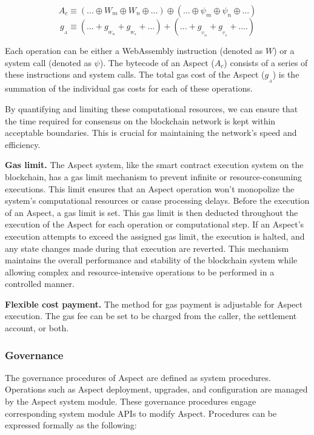 \[
A_{c} \equiv (... \oplus W_{m} \oplus W_{n} \oplus ...  ) \oplus (... \oplus \psi_{m} \oplus \psi_{n} \oplus ...  )
\]
\[
g_{_A} \equiv (...+g_{_{W_{m}}}+g_{_{W_n}}+...) + (...+g_{_{\psi_m}}+g_{_{\psi_n}}+....)
\]

Each operation can be either a WebAssembly instruction (denoted as $W$) or a system call (denoted as $\psi$). The bytecode of an Aspect ($A_c$) consists of a series of these instructions and system calls. The total gas cost of the Aspect ($g_{_A}$) is the summation of the individual gas costs for each of these operations.

By quantifying and limiting these computational resources, we can ensure that the time required for consensus on the blockchain network is kept within acceptable boundaries. This is crucial for maintaining the network's speed and efficiency.

\textbf{Gas limit.} The Aspect system, like the smart contract execution system on the blockchain, has a gas limit mechanism to prevent infinite or resource-consuming executions. This limit ensures that an Aspect operation won't monopolize the system's computational resources or cause processing delays. Before the execution of an Aspect, a gas limit is set. This gas limit is then deducted throughout the execution of the Aspect for each operation or computational step. If an Aspect's execution attempts to exceed the assigned gas limit, the execution is halted, and any state changes made during that execution are reverted. This mechanism maintains the overall performance and stability of the blockchain system while allowing complex and resource-intensive operations to be performed in a controlled manner.

\textbf{Flexible cost payment.} The method for gas payment is adjustable for Aspect execution. The gas fee can be set to be charged from the caller, the settlement account, or both.



\subsubsection{Governance}

The governance procedures of Aspect are defined as system procedures. Operations such as Aspect deployment, upgrades, and configuration are managed by the Aspect system module. These governance procedures engage corresponding system module APIs to modify Aspect. Procedures can be expressed formally as the following:

